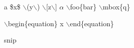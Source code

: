 \documentclass[11pt]{article}
\author{Au}
\date{2026-01-01}
\title{}
\begin{document}
\tableofcontents

a \$x\$ $\backslash$(y$\backslash$) $\backslash$[z$\backslash$] \(\alpha\) $\backslash$foo\{bar\} $\backslash$mbox\{q\}

$\backslash$begin\{equation\}
x
$\backslash$end\{equation\}

\keep
snip
\end{document}
